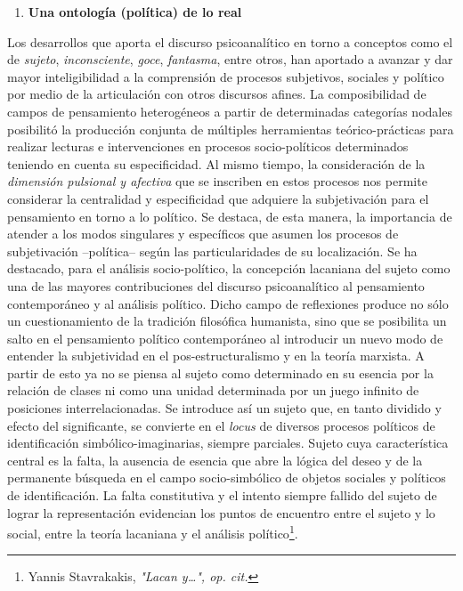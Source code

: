 \documentclass{book}
\begin{document}
\begin{enumerate}
\def\labelenumi{\arabic{enumi}.}
\setcounter{enumi}{2}
\item
  \textbf{Una ontología (política) de lo real}
\end{enumerate}

Los desarrollos que aporta el discurso psicoanalítico en torno a
conceptos como el de \emph{sujeto}, \emph{inconsciente}, \emph{goce},
\emph{fantasma}, entre otros, han aportado a avanzar y dar mayor
inteligibilidad a la comprensión de procesos subjetivos, sociales y
político por medio de la articulación con otros discursos afines. La
composibilidad de campos de pensamiento heterogéneos a partir de
determinadas categorías nodales posibilitó la producción conjunta de
múltiples herramientas teórico-prácticas para realizar lecturas e
intervenciones en procesos socio-políticos determinados teniendo en
cuenta su especificidad. Al mismo tiempo, la consideración de la
\emph{dimensión pulsional y afectiva} que se inscriben en estos procesos
nos permite considerar la centralidad y especificidad que adquiere la
subjetivación para el pensamiento en torno a lo político. Se destaca, de
esta manera, la importancia de atender a los modos singulares y
específicos que asumen los procesos de subjetivación --política-- según
las particularidades de su localización. Se ha destacado, para el
análisis socio-político, la concepción lacaniana del sujeto como una de
las mayores contribuciones del discurso psicoanalítico al pensamiento
contemporáneo y al análisis político. Dicho campo de reflexiones produce
no sólo un cuestionamiento de la tradición filosófica humanista, sino
que se posibilita un salto en el pensamiento político contemporáneo al
introducir un nuevo modo de entender la subjetividad en el
pos-estructuralismo y en la teoría marxista. A partir de esto ya no se
piensa al sujeto como determinado en su esencia por la relación de
clases ni como una unidad determinada por un juego infinito de
posiciones interrelacionadas. Se introduce así un sujeto que, en tanto
dividido y efecto del significante, se convierte en el \emph{locus} de
diversos procesos políticos de identificación simbólico-imaginarias,
siempre parciales. Sujeto cuya característica central es la falta, la
ausencia de esencia que abre la lógica del deseo y de la permanente
búsqueda en el campo socio-simbólico de objetos sociales y políticos de
identificación. La falta constitutiva y el intento siempre fallido del
sujeto de lograr la representación evidencian los puntos de encuentro
entre el sujeto y lo social, entre la teoría lacaniana y el análisis
político\footnote{Yannis Stavrakakis, \emph{"Lacan y\ldots", op. cit.}}.
\end{document}

